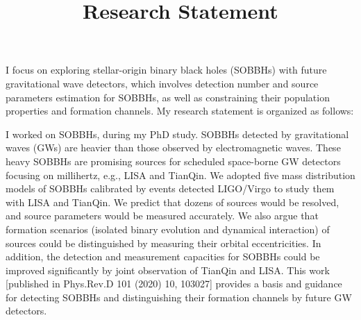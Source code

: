 \documentclass[12pt,a4paper,sans]{article}%
\title{\vspace{-2.5cm}\Huge Research Statement \vspace{-2.2em}}
\date{}
\begin{document}
\maketitle

I focus on exploring stellar-origin binary black holes (SOBBHs) with future gravitational wave detectors, which involves detection
number and source parameters estimation for SOBBHs, as well as constraining their population properties and formation channels. My research statement is organized as
follows:  

I worked on SOBBHs, during my PhD study. SOBBHs detected by
gravitational waves (GWs) are heavier than those observed by electromagnetic waves. These heavy SOBBHs are promising sources for scheduled
space-borne GW detectors focusing on millihertz, e.g., LISA and TianQin. We adopted five mass
distribution models of SOBBHs calibrated by events detected LIGO/Virgo to study them with LISA and TianQin. We predict that dozens of sources would be resolved, and source parameters
would be measured accurately. We also argue that formation scenarios (isolated binary evolution and dynamical interaction) of sources
could be distinguished by measuring their orbital eccentricities. In addition, the detection and measurement capacities
for SOBBHs could be improved significantly by joint
observation of TianQin and LISA. This work [published in Phys.Rev.D 101 (2020) 10, 103027] provides a basis and guidance for detecting SOBBHs and distinguishing their formation channels by future GW
detectors. 
\end{document}
